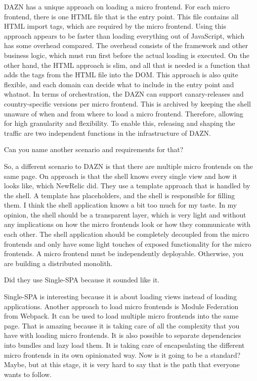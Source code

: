 \begin{description}
    \LucaMezzalira DAZN has a unique approach on loading a micro frontend. For each micro frontend, there is one HTML file that is the entry point. This file contains all HTML import tags, which are required by the micro frontend. Using this approach appears to be faster than loading everything out of JavaScript, which has some overhead compared. The overhead consists of the framework and other business logic, which must run first before the actual loading is executed. On the other hand, the HTML approach is slim, and all that is needed is a function that adds the tags from the HTML file into the DOM. This approach is also quite flexible, and each domain can decide what to include in the entry point and whatnot. In terms of orchestration, the DAZN can support canary-releases and country-specific versions per micro frontend. This is archived by keeping the shell unaware of when and from where to load a micro frontend. Therefore, allowing for high granularity and flexibility. To enable this, releasing and shaping the traffic are two independent functions in the infrastructure of DAZN.

    \NicoVogel Can you name another scenario and requirements for that?

    \LucaMezzalira So, a different scenario to DAZN is that there are multiple micro frontends on the same page. On approach is that the shell knows every single view and how it looks like, which NewRelic did. They use a template approach that is handled by the shell. A template has placeholders, and the shell is responsible for filling them. I think the shell application knows a bit too much for my taste. In my opinion, the shell should be a transparent layer, which is very light and without any implications on how the micro frontends look or how they communicate with each other. The shell application should be completely decoupled from the micro frontends and only have some light touches of exposed functionality for the micro frontends. A micro frontend must be independently deployable. Otherwise, you are building a distributed monolith.

    \NicoVogel Did they use Single-SPA because it sounded like it.

    \LucaMezzalira Single-SPA is interesting because it is about loading views instead of loading applications. Another approach to load micro frontends is Module Federation from Webpack. It can be used to load multiple micro frontends into the same page. That is amazing because it is taking care of all the complexity that you have with loading micro frontends. It is also possible to separate dependencies into bundles and lazy load them. It is taking care of encapsulating the different micro frontends in its own opinionated way. Now is it going to be a standard? Maybe, but at this stage, it is very hard to say that is the path that everyone wants to follow.




\end{description}
